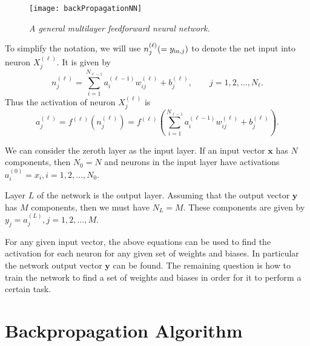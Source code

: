 \documentclass[fleqn]{article}
\begin{document}
\begin{figure}
\texttt{[image: backPropagationNN]}
\caption{ \it{ A general  multilayer feedforward neural network.}}
\end{figure}

To simplify the notation,
we will use
$n_j^{(\ell)} (= y_{\mbox{\scriptsize{in,$j$}}})$
to denote the net input into neuron $X_j^{(\ell)}$.
It is given by
\[
n_j^{(\ell)} = \sum_{i=1}^{N_{\ell-1}} a_i^{(\ell-1)} w_{ij}^{(\ell)} + b_j^{(\ell)}, \qquad
j=1, 2, \ldots, N_\ell.
\]
Thus the activation of neuron $X_j^{(\ell)}$ is
\[
a_j^{(\ell)} = f^{(\ell)}(n_j^{(\ell)}) =
f^{(\ell)}( \sum_{i=1}^{N_{\ell-1}} a_i^{(\ell-1)} w_{ij}^{(\ell)} + b_j^{(\ell)} ).
\]

We can consider the zeroth layer as the input layer.
If an input vector $\mathbf x$ has $N$ components,
then $N_0=N$ and neurons in the input layer have activations
$a_i^{(0)} = x_i, i=1, 2, \ldots, N_0$.

Layer $L$ of the network is the output layer.
Assuming that the output vector $\mathbf y$ has $M$ components,
then we must have $N_L=M$.
These components are given by
$y_j = a_j^{(L)}, j=1, 2, \ldots, M$.

For any given input vector, the above equations can be used to find the activation
for each neuron for any given set of weights and biases.
In particular the network output vector $\mathbf y$ can be found.
The remaining question is how to train the network to find
a set of weights and biases in order for it to perform a certain task.

\section{Backpropagation Algorithm}
\end{document}
